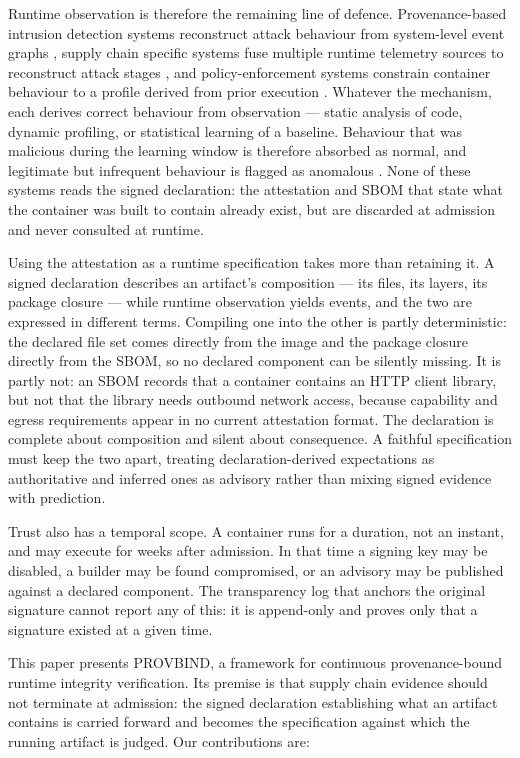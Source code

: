 \documentclass[conference]{IEEEtran}
\begin{document}
Runtime observation is therefore the remaining line of defence.
Provenance-based intrusion detection systems reconstruct attack
behaviour from system-level event graphs \cite{nodlink2024,orthrus2025},
supply chain specific systems fuse multiple runtime telemetry sources to
reconstruct attack stages \cite{fusechain2026}, and policy-enforcement
systems constrain container behaviour to a profile derived from prior
execution \cite{goleash2025}. Whatever the mechanism, each derives
correct behaviour from observation --- static analysis of code, dynamic
profiling, or statistical learning of a baseline. Behaviour that was
malicious during the learning window is therefore absorbed as normal,
and legitimate but infrequent behaviour is flagged as anomalous
\cite{bilot2025}. None of these systems reads the signed declaration:
the attestation and SBOM that state what the container was built to
contain already exist, but are discarded at admission and never
consulted at runtime.

Using the attestation as a runtime specification takes more than
retaining it. A signed declaration describes an artifact's composition
--- its files, its layers, its package closure --- while runtime
observation yields events, and the two are expressed in different terms.
Compiling one into the other is partly deterministic: the declared file
set comes directly from the image and the package closure directly from
the SBOM, so no declared component can be silently missing. It is partly
not: an SBOM records that a container contains an HTTP client library,
but not that the library needs outbound network access, because
capability and egress requirements appear in no current attestation
format. The declaration is complete about composition and silent about
consequence. A faithful specification must keep the two apart, treating
declaration-derived expectations as authoritative and inferred ones as
advisory rather than mixing signed evidence with prediction.

Trust also has a temporal scope. A container runs for a duration, not an
instant, and may execute for weeks after admission. In that time a
signing key may be disabled, a builder may be found compromised, or an
advisory may be published against a declared component. The transparency
log that anchors the original signature cannot report any of this: it is
append-only and proves only that a signature existed at a given time.

This paper presents PROVBIND, a framework for continuous
provenance-bound runtime integrity verification. Its premise is that
supply chain evidence should not terminate at admission: the signed
declaration establishing what an artifact contains is carried forward
and becomes the specification against which the running artifact is
judged. Our contributions are:
\end{document}
